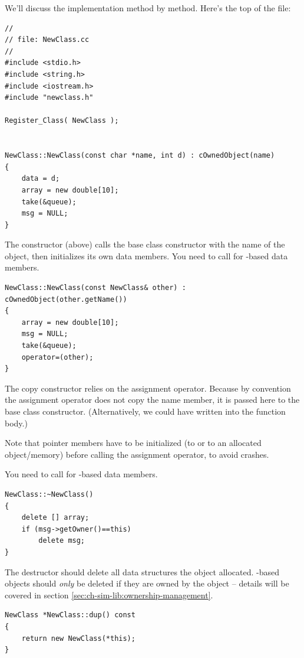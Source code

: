 We'll discuss the implementation method by method.
Here's the top of the  file:

\begin{verbatim}
//
// file: NewClass.cc
//
#include <stdio.h>
#include <string.h>
#include <iostream.h>
#include "newclass.h"

Register_Class( NewClass );


NewClass::NewClass(const char *name, int d) : cOwnedObject(name)
{
    data = d;
    array = new double[10];
    take(&queue);
    msg = NULL;
}
\end{verbatim}

The constructor (above) calls the base class constructor with
the name of the object, then initializes its own data members.
You need to call  for -based data members.


\begin{verbatim}
NewClass::NewClass(const NewClass& other) : cOwnedObject(other.getName())
{
    array = new double[10];
    msg = NULL;
    take(&queue);
    operator=(other);
}
\end{verbatim}

The copy constructor relies on the assignment operator. Because
by convention the assignment operator does not copy the
name member, it is passed here to the base class constructor.
(Alternatively, we could have written 
into the function body.)

Note that pointer members have to be initialized (to  or to an
allocated object/memory) before calling the assignment operator,
to avoid crashes.

You need to call  for -based data members.

\begin{verbatim}
NewClass::~NewClass()
{
    delete [] array;
    if (msg->getOwner()==this)
        delete msg;
}
\end{verbatim}

The destructor should delete all data structures the object allocated.
-based objects should \textit{only} be deleted if they
are owned by the object -- details will be covered in section
\ref{sec:ch-sim-lib:ownership-management}.

\begin{verbatim}
NewClass *NewClass::dup() const
{
    return new NewClass(*this);
}
\end{verbatim}

